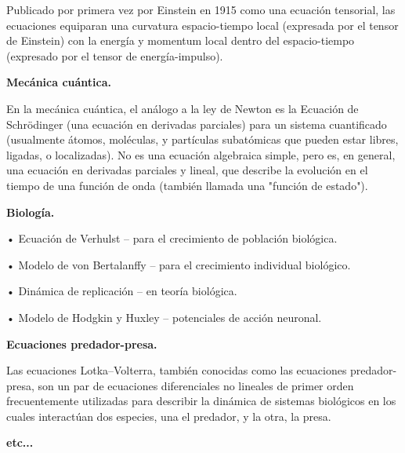 \textcolor{gris}{Publicado por primera vez por Einstein en 1915 como una ecuación tensorial, las ecuaciones equiparan una curvatura espacio-tiempo local (expresada por el tensor de Einstein) con la energía y momentum local dentro del espacio-tiempo (expresado por el tensor de energía-impulso).}

\textcolor{gris}{\textbf{Mecánica cuántica.}}

\textcolor{gris}{En la mecánica cuántica, el análogo a la ley de Newton es la Ecuación de Schrödinger (una ecuación en derivadas parciales) para un sistema cuantificado (usualmente átomos, moléculas, y partículas subatómicas que pueden estar libres, ligadas, o localizadas). No es una ecuación algebraica simple, pero es, en general, una ecuación en derivadas parciales y lineal, que describe la evolución en el tiempo de una función de onda (también llamada una "función de estado").}

\textcolor{gris}{\textbf{Biología.}}
 
\textcolor{gris}{•	Ecuación de Verhulst – para el crecimiento de población biológica.}
 
\textcolor{gris}{•	Modelo de von Bertalanffy – para el crecimiento individual biológico.}
 
\textcolor{gris}{•	Dinámica de replicación – en teoría biológica.}
 
\textcolor{gris}{•	Modelo de Hodgkin y Huxley – potenciales de acción neuronal.}
	
\textcolor{gris}{\textbf{Ecuaciones predador-presa.}}

\textcolor{gris}{Las ecuaciones Lotka–Volterra, también conocidas como las ecuaciones predador-presa, son un par de ecuaciones diferenciales no lineales de primer orden frecuentemente utilizadas para describir la dinámica de sistemas biológicos en los cuales interactúan dos especies, una el predador, y la otra, la presa. }

\textcolor{gris}{\textbf{etc...}}



\chapter*{}
	